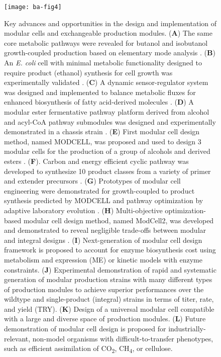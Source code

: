\begin{figure}[h]
  \centering
  \texttt{[image: ba-fig4]}
    \caption[Key advances and opportunities in the design and
    implementation of modular cells and exchangeable production modules]{Key advances and opportunities in the design and
implementation of modular cells and exchangeable production modules.
    (\textbf{A}) The same core metabolic pathways were revealed for butanol
and isobutanol growth-coupled production based on elementary mode
analysis \citep{trinh2012}. (\textbf{B}) An \emph{E. coli}
cell with minimal metabolic functionality designed to require product
(ethanol) synthesis for cell growth was experimentally validated
\citep{trinh2008}. (\textbf{C}) A dynamic sensor-regulator
system was designed and implemented to balance metabolic fluxes for
enhanced biosynthesis of fatty acid-derived molecules
\citep{zhang2012}. (\textbf{D}) A modular ester fermentative
pathway platform derived from alcohol and acyl-CoA pathway submodules
was designed and experimentally demonstrated in a chassis strain
\citep{layton2014}. (\textbf{E}) First modular cell design
method, named MODCELL, was proposed and used to design 3 modular cells
for the production of a group of alcohols and derived esters
\citep{trinh2015}. (\textbf{F}). Carbon and energy efficient
cyclic pathway was developed to synthesize 10 product classes from a
variety of primer and extender precursors \citep{cheong2016}.
(\textbf{G}) Prototypes of modular cell engineering were demonstrated
for growth-coupled to product synthesis predicted by MODCELL
\citep{trinh2015} and pathway optimization by adaptive
laboratory evolution \citep{wilbanks2017}. (\textbf{H})
Multi-objective optimization-based modular cell design method, named
ModCell2, was developed and demonstrated to reveal negligible trade-offs
between modular and integral designs \citep{garcia2019}.
(\textbf{I}) Next-generation of modular cell design framework is
proposed to account for enzyme biosynthesis cost using metabolism and
expression (ME) or kinetic models with enzyme constraints. (\textbf{J})
Experimental demonstration of rapid and systematic generation of modular
production strains with many different types of production modules to
achieve superior performances over the wildtype and single-product
(integral) strains in terms of titer, rate, and yield (TRY).
(\textbf{K}) Design of a universal modular cell compatible with a large
and diverse space of production modules. (\textbf{L}) Future
demonstration of modular cell design is proposed for
industrially-relevant, non-model organisms with difficult-to-transfer
phenotypes, such as efficient assimilation of CO\textsubscript{2},
    CH\textsubscript{4}, or cellulose.}
    \label{fig:ba-fig4}
\end{figure}


